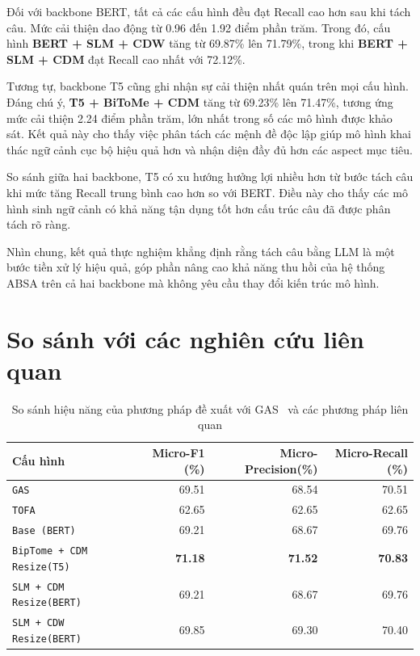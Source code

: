Đối với backbone BERT, tất cả các cấu hình đều đạt Recall cao hơn sau khi tách câu. Mức cải thiện dao động từ 0.96 đến 1.92 điểm phần trăm. Trong đó, cấu hình \textbf{BERT + SLM + CDW} tăng từ 69.87\% lên 71.79\%, trong khi \textbf{BERT + SLM + CDM} đạt Recall cao nhất với 72.12\%.

Tương tự, backbone T5 cũng ghi nhận sự cải thiện nhất quán trên mọi cấu hình. Đáng chú ý, \textbf{T5 + BiToMe + CDM} tăng từ 69.23\% lên 71.47\%, tương ứng mức cải thiện 2.24 điểm phần trăm, lớn nhất trong số các mô hình được khảo sát. Kết quả này cho thấy việc phân tách các mệnh đề độc lập giúp mô hình khai thác ngữ cảnh cục bộ hiệu quả hơn và nhận diện đầy đủ hơn các aspect mục tiêu.

So sánh giữa hai backbone, T5 có xu hướng hưởng lợi nhiều hơn từ bước tách câu khi mức tăng Recall trung bình cao hơn so với BERT. Điều này cho thấy các mô hình sinh ngữ cảnh có khả năng tận dụng tốt hơn cấu trúc câu đã được phân tách rõ ràng.

Nhìn chung, kết quả thực nghiệm khẳng định rằng tách câu bằng LLM là một bước tiền xử lý hiệu quả, góp phần nâng cao khả năng thu hồi của hệ thống ABSA trên cả hai backbone mà không yêu cầu thay đổi kiến trúc mô hình.


\section{So sánh với các nghiên cứu liên quan}
\begin{table}[H]
\centering
\small
\caption{So sánh hiệu năng của phương pháp đề xuất với GAS~\cite{zhang2021gas} và các phương pháp liên quan}
\label{tab:paper}
\begin{tabular}{@{}lrrr@{}}
\toprule
\textbf{Cấu hình} & \textbf{Micro-F1 (\%)} & \textbf{Micro- Precision(\%)} &\textbf{Micro-Recall (\%)}\\
\midrule
\texttt{GAS} & 69.51  & 68.54 &70.51\\
\texttt{TOFA} & 62.65 & 62.65 & 62.65 \\
\texttt{Base (BERT)} & 69.21 & 68.67 & 69.76 \\
\texttt{BipTome + CDM Resize(T5)} & \textbf{71.18} &\textbf{71.52} & \textbf{70.83}\\
\texttt{SLM + CDM Resize(BERT)} & 69.21 & 68.67 & 69.76 \\
\texttt{SLM + CDW Resize(BERT)} & 69.85 & 69.30 & 70.40 \\
\bottomrule
\end{tabular}
\end{table}



